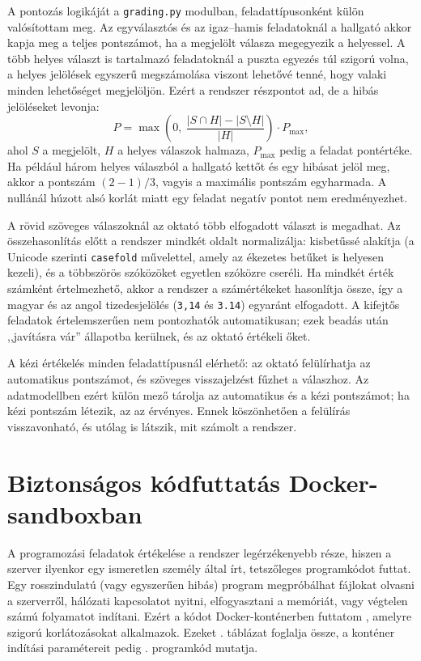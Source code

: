 A pontozás logikáját a \texttt{grading.py} modulban, feladattípusonként külön valósítottam meg.
Az egyválasztós és az igaz--hamis feladatoknál a hallgató akkor kapja meg a teljes pontszámot, ha
a megjelölt válasza megegyezik a helyessel. A több helyes választ is tartalmazó feladatoknál a
puszta egyezés túl szigorú volna, a helyes jelölések egyszerű megszámolása viszont lehetővé tenné,
hogy valaki minden lehetőséget megjelöljön. Ezért a rendszer részpontot ad, de a hibás jelöléseket
levonja:
\begin{equation}
  P = \max\!\left(0,\ \frac{|S \cap H| - |S \setminus H|}{|H|}\right) \cdot P_{\max},
  \label{eq:tobbvalasz}
\end{equation}
ahol $S$ a megjelölt, $H$ a helyes válaszok halmaza, $P_{\max}$ pedig a feladat pontértéke. Ha
például három helyes válaszból a hallgató kettőt és egy hibásat jelöl meg, akkor a pontszám
$(2-1)/3$, vagyis a maximális pontszám egyharmada. A nullánál húzott alsó korlát miatt egy feladat
negatív pontot nem eredményezhet.

A rövid szöveges válaszoknál az oktató több elfogadott választ is megadhat. Az összehasonlítás előtt
a rendszer mindkét oldalt normalizálja: kisbetűssé alakítja (a Unicode szerinti
\texttt{casefold} művelettel, amely az ékezetes betűket is helyesen kezeli), és a többszörös
szóközöket egyetlen szóközre cseréli. Ha mindkét érték számként értelmezhető, akkor a rendszer a
számértékeket hasonlítja össze, így a magyar és az angol tizedesjelölés (\texttt{3,14} és
\texttt{3.14}) egyaránt elfogadott. A kifejtős feladatok értelemszerűen nem pontozhatók
automatikusan; ezek beadás után ,,javításra vár'' állapotba kerülnek, és az oktató értékeli őket.

A kézi értékelés minden feladattípusnál elérhető: az oktató felülírhatja az automatikus pontszámot,
és szöveges visszajelzést fűzhet a válaszhoz. Az adatmodellben ezért külön mező tárolja az
automatikus és a kézi pontszámot; ha kézi pontszám létezik, az az érvényes. Ennek köszönhetően a
felülírás visszavonható, és utólag is látszik, mit számolt a rendszer.

\section{Biztonságos kódfuttatás Docker-sandboxban}
\label{sec:sandbox}

A programozási feladatok értékelése a rendszer legérzékenyebb része, hiszen a szerver ilyenkor
egy ismeretlen személy által írt, tetszőleges programkódot futtat. Egy rosszindulatú (vagy
egyszerűen hibás) program megpróbálhat fájlokat olvasni a szerverről, hálózati kapcsolatot
nyitni, elfogyasztani a memóriát, vagy végtelen számú folyamatot indítani. Ezért a kódot
Docker-konténerben futtatom \cite{merkel2014docker}, amelyre szigorú korlátozásokat alkalmazok.
Ezeket . táblázat foglalja össze, a konténer indítási paramétereit pedig
. programkód mutatja.

